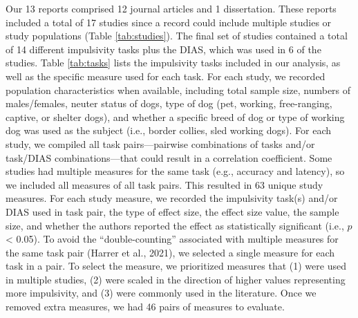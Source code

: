 \documentclass[
  ,pub,floatsintext]{apa6}
\begin{document}
Our 13 reports comprised 12 journal articles and 1 dissertation. These reports included a total of 17 studies since a record could include multiple studies or study populations (Table \ref{tab:studies}). The final set of studies contained a total of 14 different impulsivity tasks plus the DIAS, which was used in 6 of the studies. Table \ref{tab:tasks} lists the impulsivity tasks included in our analysis, as well as the specific measure used for each task. For each study, we recorded population characteristics when available, including total sample size, numbers of males/females, neuter status of dogs, type of dog (pet, working, free-ranging, captive, or shelter dogs), and whether a specific breed of dog or type of working dog was used as the subject (i.e., border collies, sled working dogs). For each study, we compiled all task pairs---pairwise combinations of tasks and/or task/DIAS combinations---that could result in a correlation coefficient. Some studies had multiple measures for the same task (e.g., accuracy and latency), so we included all measures of all task pairs. This resulted in 63 unique study measures. For each study measure, we recorded the impulsivity task(s) and/or DIAS used in task pair, the type of effect size, the effect size value, the sample size, and whether the authors reported the effect as statistically significant (i.e., \(p\) \textless{} 0.05). To avoid the ``double-counting'' associated with multiple measures for the same task pair (Harrer et al., 2021), we selected a single measure for each task in a pair. To select the measure, we prioritized measures that (1) were used in multiple studies, (2) were scaled in the direction of higher values representing more impulsivity, and (3) were commonly used in the literature. Once we removed extra measures, we had 46 pairs of measures to evaluate.

\renewcommand{\arraystretch}{1.2}
\end{document}
